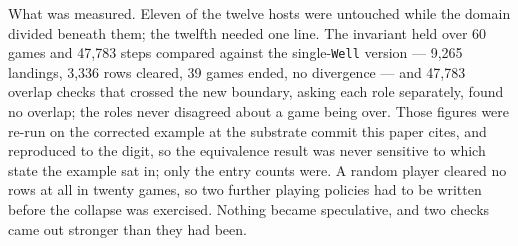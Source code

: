 \documentclass[
]{article}
\begin{document}
What was measured. Eleven of the twelve hosts were untouched while the
domain divided beneath them; the twelfth needed one line. The invariant
held over 60 games and 47,783 steps compared against the
single-\texttt{Well} version --- 9,265 landings, 3,336 rows cleared, 39
games ended, no divergence --- and 47,783 overlap checks that crossed
the new boundary, asking each role separately, found no overlap; the
roles never disagreed about a game being over. Those figures were re-run
on the corrected example at the substrate commit this paper cites, and
reproduced to the digit, so the equivalence result was never sensitive
to which state the example sat in; only the entry counts were. A random
player cleared no rows at all in twenty games, so two further playing
policies had to be written before the collapse was exercised. Nothing
became speculative, and two checks came out stronger than they had been.
\end{document}
